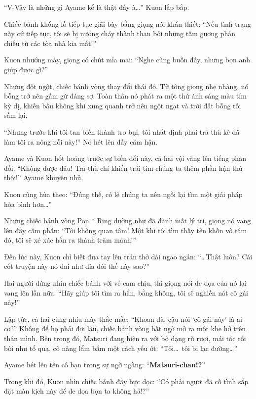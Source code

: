 \documentclass[../main.tex]{subfiles}
\begin{document}
``V-Vậy là những gì Ayame kể là thật đấy à\dots'' Kuon lắp bắp.

Chiếc bánh khổng lồ tiếp tục giãi bày bằng giọng nói khẩn thiết: ``Nếu tình trạng này cứ tiếp tục, tôi sẽ bị nướng cháy thành than bởi những tấm gương phản chiếu từ các tòa nhà kia mất!''

Kuon nhướng mày, giọng có chút mỉa mai: ``Nghe cũng buồn đấy, nhưng bọn anh giúp được gì?''


Nhưng đột ngột, chiếc bánh vòng thay đổi thái độ. Từ tông giọng nhẹ nhàng, nó bỗng trở nên gầm gừ đáng sợ. Toàn thân nó phát ra một thứ ánh sáng màu tím kỳ dị, khiến bầu không khí xung quanh trở nên ngột ngạt và trời đất bỗng tối sầm lại.

``Nhưng trước khi tôi tan biến thành tro bụi, tôi nhất định phải trả thù kẻ đã làm tôi ra nông nỗi này!'' Nó hét lên đầy căm hận.

Ayame và Kuon hốt hoảng trước sự biến đổi này, cả hai vội vàng lên tiếng phản đối.
``Không được đâu! Trả thù chỉ khiến trái tim chúng ta thêm phần hận thù thôi!'' Ayame khuyên nhủ.

Kuon cũng hùa theo: ``Đúng thế, có lẽ chúng ta nên ngồi lại tìm một giải pháp hòa bình hơn\dots''

Nhưng chiếc bánh vòng Pon * Ring dường như đã đánh mất lý trí, giọng nó vang lên đầy căm phẫn: ``Tôi không quan tâm! Một khi tôi tìm thấy tên khốn vô tâm đó, tôi sẽ xé xác hắn ra thành trăm mảnh!''

Đến lúc này, Kuon chỉ biết đưa tay lên trán thở dài ngao ngán: ``\dots Thật luôn? Cái cốt truyện này nó dai như đỉa đói thế này sao?''

Hai người đứng nhìn chiếc bánh với vẻ cam chịu, thì giọng nói đe dọa của nó lại vang lên lần nữa: ``Hãy giúp tôi tìm ra hắn, bằng không, tôi sẽ nghiền nát cô gái này!''

Lập tức, cả hai cùng nhíu mày thắc mắc: ``Khoan đã, cậu nói `cô gái này' là ai cơ?''
Không để họ phải đợi lâu, chiếc bánh vòng bất ngờ mở ra một khe hở trên thân mình. Bên trong đó, Matsuri đang hiện ra với bộ dạng rũ rượi, mái tóc rối bời như tổ quạ, cô nàng lẩm bẩm một cách yếu ớt: ``Tôi\dots\ tôi bị lạc đường\dots''


Ayame hét lên tên cô bạn trong sự ngỡ ngàng: ``\textbf{Matsuri-chan!?}''

Trong khi đó, Kuon nhìn chiếc bánh đầy bực dọc: ``Có phải ngươi đã cố tình sắp đặt màn kịch này để đe dọa bọn ta không hả!?''
\end{document}
